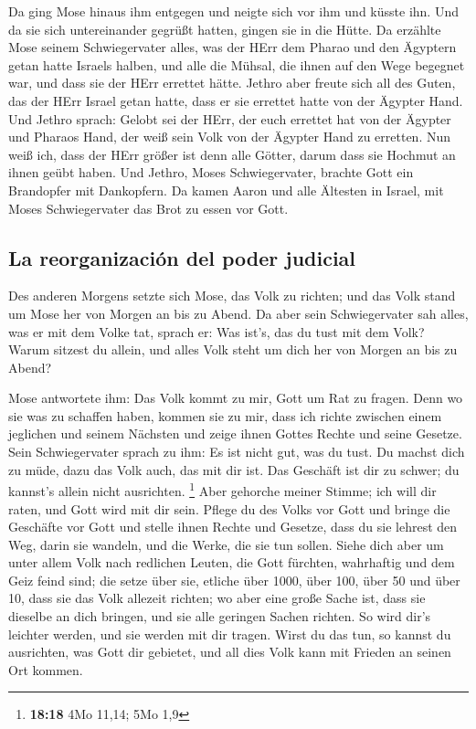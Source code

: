  Da ging Mose hinaus ihm entgegen und neigte sich vor ihm
und küsste ihn. Und da sie sich untereinander gegrüßt hatten, gingen sie
in die Hütte.  Da erzählte Mose seinem Schwiegervater
alles, was der HErr dem Pharao und den Ägyptern getan hatte Israels
halben, und alle die Mühsal, die ihnen auf den Wege begegnet war, und
dass sie der HErr errettet hätte.  Jethro aber freute sich
all des Guten, das der HErr Israel getan hatte, dass er sie errettet
hatte von der Ägypter Hand.  Und Jethro sprach: Gelobt
sei der HErr, der euch errettet hat von der Ägypter und Pharaos Hand,
der weiß sein Volk von der Ägypter Hand zu erretten.  Nun
weiß ich, dass der HErr größer ist denn alle Götter, darum dass sie
Hochmut an ihnen geübt haben.  Und Jethro, Moses
Schwiegervater, brachte Gott ein Brandopfer mit Dankopfern. Da kamen
Aaron und alle Ältesten in Israel, mit Moses Schwiegervater das Brot zu
essen vor Gott.

\hypertarget{la-reorganizaciuxf3n-del-poder-judicial}{%
\subsection{La reorganización del poder
judicial}\label{la-reorganizaciuxf3n-del-poder-judicial}}

 Des anderen Morgens setzte sich Mose, das Volk zu
richten; und das Volk stand um Mose her von Morgen an bis zu Abend.
 Da aber sein Schwiegervater sah alles, was er mit dem
Volke tat, sprach er: Was ist's, das du tust mit dem Volk? Warum sitzest
du allein, und alles Volk steht um dich her von Morgen an bis zu Abend?

 Mose antwortete ihm: Das Volk kommt zu mir, Gott um Rat
zu fragen.  Denn wo sie was zu schaffen haben, kommen sie
zu mir, dass ich richte zwischen einem jeglichen und seinem Nächsten und
zeige ihnen Gottes Rechte und seine Gesetze.  Sein
Schwiegervater sprach zu ihm: Es ist nicht gut, was du tust.
 Du machst dich zu müde, dazu das Volk auch, das mit dir
ist. Das Geschäft ist dir zu schwer; du kannst's allein nicht
ausrichten. \footnote{\textbf{18:18} 4Mo 11,14; 5Mo 1,9} 
Aber gehorche meiner Stimme; ich will dir raten, und Gott wird mit dir
sein. Pflege du des Volks vor Gott und bringe die Geschäfte vor Gott
 und stelle ihnen Rechte und Gesetze, dass du sie lehrest
den Weg, darin sie wandeln, und die Werke, die sie tun sollen.
 Siehe dich aber um unter allem Volk nach redlichen
Leuten, die Gott fürchten, wahrhaftig und dem Geiz feind sind; die setze
über sie, etliche über 1000, über 100, über 50 und über 10,
 dass sie das Volk allezeit richten; wo aber eine große
Sache ist, dass sie dieselbe an dich bringen, und sie alle geringen
Sachen richten. So wird dir's leichter werden, und sie werden mit dir
tragen.  Wirst du das tun, so kannst du ausrichten, was
Gott dir gebietet, und all dies Volk kann mit Frieden an seinen Ort
kommen.

